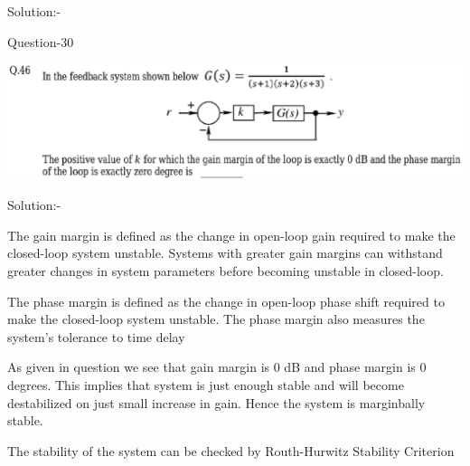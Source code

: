 \documentclass[journal,12pt,twocolumn]{IEEEtran}
\begin{document}
\begin{frame}{Solution:- }
\begin{frame}{Question-30 }
\begin{block}
\includegraphics[scale=0.33]{./figs/1.eps}

\end{block}
\end{frame}

\begin{frame}{Solution:- }

\begin{block}

The gain margin is defined as the change in open-loop gain required to make the closed-loop system unstable. Systems with greater gain margins can withstand greater changes in system parameters before becoming unstable in closed-loop. 

\end{block} \vspace{16pt}
\begin{block}

The phase margin is defined as the change in open-loop phase shift required to make the closed-loop system unstable. The phase margin also measures the system's tolerance to time delay
\end{block} \vspace{16pt}




\end{frame}



\begin{frame}{}
\begin{block}

As given in question we see that gain margin is 0 dB and phase margin is 0 degrees. This implies that system is just enough stable and will become destabilized on just small increase in gain. Hence the system is marginbally stable.
\end{block}

\begin{block}

The stability of the system can be checked by Routh-Hurwitz Stability Criterion 
\end{block}


\end{frame}
\end{frame}
\end{document}
